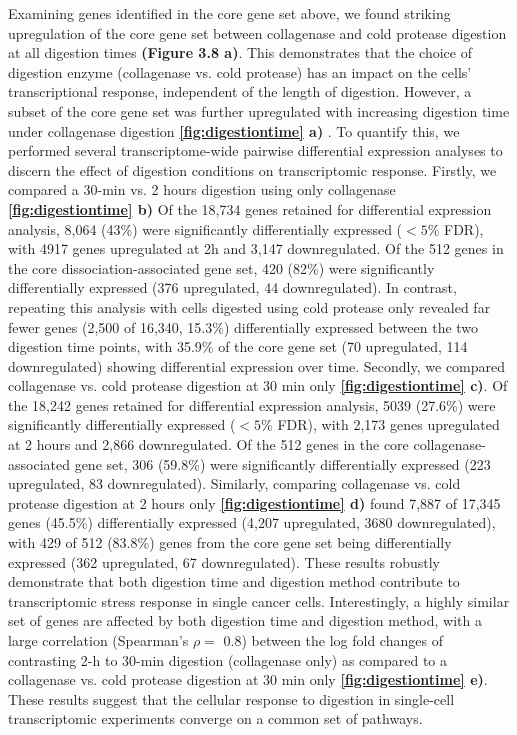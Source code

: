 Examining genes identified in the core gene set above, we found striking upregulation of the core gene set between collagenase and cold protease digestion at all digestion times \textbf{(Figure 3.8 a)}. This demonstrates that the choice of digestion enzyme (collagenase vs. cold protease) has an impact on the cells' transcriptional response, independent of the length of digestion. However, a subset of the core gene set was further upregulated with increasing digestion time under collagenase digestion \textbf{\autoref{fig:digestiontime} a)} . To quantify this, we performed several transcriptome-wide pairwise differential expression analyses to discern the effect of digestion conditions on transcriptomic response. Firstly, we compared a 30-min vs. 2 hours digestion using only collagenase \textbf{\autoref{fig:digestiontime} b)} Of the 18,734 genes retained for differential expression analysis, 8,064 (43\%) were significantly differentially expressed ($<5\%$ FDR), with 4917 genes upregulated at 2h and 3,147 downregulated. Of the 512 genes in the core dissociation-associated gene set, 420 (82\%) were significantly differentially expressed (376 upregulated, 44 downregulated).
In contrast, repeating this analysis with cells digested using cold protease only revealed far fewer genes (2,500 of 16,340, 15.3\%) differentially expressed between the two digestion time points, with 35.9\% of the core gene set (70 upregulated, 114 downregulated) showing differential expression over time.
Secondly, we compared collagenase vs. cold protease digestion at 30 min only \textbf{\autoref{fig:digestiontime} c)}. Of the 18,242 genes retained for differential expression analysis, 5039 (27.6\%) were significantly differentially expressed ($<5\%$ FDR), with 2,173 genes upregulated at 2 hours and 2,866 downregulated. Of the 512 genes in the core collagenase-associated gene set, 306 (59.8\%) were significantly differentially expressed (223 upregulated, 83 downregulated). Similarly, comparing collagenase vs. cold protease digestion at  2 hours only \textbf{\autoref{fig:digestiontime} d)} found 7,887 of 17,345 genes (45.5\%) differentially expressed (4,207 upregulated, 3680 downregulated), with 429 of 512 (83.8\%) genes from the core gene set being differentially expressed (362 upregulated, 67 downregulated). These results robustly demonstrate that both digestion time and digestion method contribute to transcriptomic stress response in single cancer cells.
Interestingly, a highly similar set of genes are affected by both digestion time and digestion method, with a large correlation (Spearman's $\rho=$ 0.8) between the log fold changes of contrasting 2-h to 30-min digestion (collagenase only) as compared to a collagenase vs. cold protease digestion at 30 min only \textbf{\autoref{fig:digestiontime} e)}. These results suggest that the cellular response to digestion in single-cell transcriptomic experiments converge on a common set of pathways.


